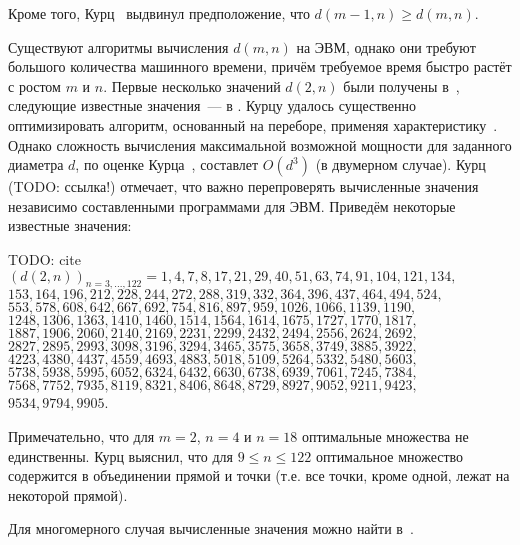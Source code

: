 Кроме того, Курц~\cite{kurz2008bounds} выдвинул предположение, что $d(m - 1, n) \geq d(m, n)$.




Существуют алгоритмы вычисления $d(m,n)$ на ЭВМ, однако они требуют большого количества машинного времени,
причём требуемое время быстро растёт с ростом $m$ и $n$.
Первые несколько значений $d(2,n)$ были получены в~\cite{harborth1998integral},
следующие известные значения~--- в \cite{kurz2005characteristic,kurz2006konstruktion,kurz2008minimum,kurz2008bounds,our-mz-rus}.
Курцу удалось существенно оптимизировать алгоритм, основанный на переборе, применяя характеристику~\cite{kurz2005characteristic,kreisel2008heptagon}.
Однако сложность вычисления максимальной возможной мощности для заданного диаметра $d$, по оценке Курца~\cite{kreisel2008heptagon},
составлет $O(d^3)$ (в двумерном случае).
Курц (TODO: ссылка!) отмечает, что важно перепроверять вычисленные значения независимо составленными программами для ЭВМ.
Приведём некоторые известные значения:

TODO: cite
\\
$
(d(2, n))_{n=3,...,122} = 1, 4, 7, 8, 17, 21, 29, 40, 51, 63, 74, 91, 104, 121,
134, $\\$153, 164,
196, 212, 228, 244, 272, 288, 319, 332, 364, 396, 437, 464, 494, 524,$\\$ 553, 578, 608,
642, 667, 692, 754, 816, 897, 959, 1026, 1066, 1139, 1190, $\\$ 1248, 1306, 1363, 1410,
1460, 1514, 1564, 1614, 1675, 1727, 1770, 1817, $\\$1887, 1906, 2060, 2140, 2169,
2231, 2299, 2432, 2494, 2556, 2624, 2692, $\\$2827, 2895, 2993, 3098, 3196, 3294,
3465, 3575, 3658, 3749, 3885, 3922, $\\$4223, 4380, 4437, 4559, 4693, 4883,
5018, 5109, 5264, 5332, 5480, 5603, $\\$5738, 5938, 5995, 6052,
6324, 6432, 6630, 6738, 6939, 7061, 7245, 7384, $\\$7568, 7752, 7935, 8119, 8321,
8406, 8648, 8729, 8927, 9052, 9211, 9423, $\\$9534, 9794, 9905
$.

Примечательно, что для $m=2$, $n=4$ и $n=18$ оптимальные множества не единственны.
Курц выяснил, что для $9 \leq n \leq 122$ оптимальное множество содержится
в объединении прямой и точки (т.е. все точки, кроме одной, лежат на некоторой прямой).

Для многомерного случая вычисленные значения можно найти в~\cite{kurz2008bounds}.


